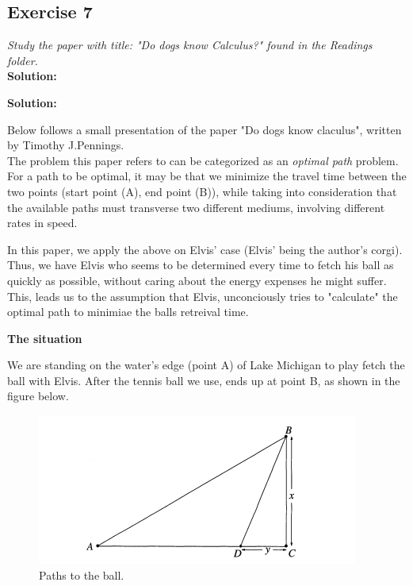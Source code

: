 \documentclass[12pt]{article}
\begin{document}

\subsection*{Exercise 7}
\textit{Study the paper with title: "Do dogs know Calculus?" found in the Readings folder.}\\
\textbf{Solution:} \par
\textbf{Solution:} \par
{Below follows a small presentation of the paper "Do dogs know claculus", written by Timothy J.Pennings.\\
The problem this paper refers to can be categorized as an \textit{optimal path} problem. For a path to be optimal, it may be that we minimize the travel time between the two points (start point (A), end point (B)), while taking into consideration that the available paths must transverse two different mediums, involving different rates in speed.\par 
In this paper, we apply the above on Elvis' case (Elvis' being the author's corgi). Thus, we have Elvis who seems to be determined every time to fetch his ball as quickly as possible, without caring about the energy expenses he might suffer. This, leads us to the assumption that Elvis, unconciously tries to "calculate" the optimal path to minimiae the balls retreival time.\par 
\begin{center}
\textbf{The situation}
\end{center}
We are standing on the water's edge (point A) of Lake Michigan to play fetch the ball with Elvis. After the tennis ball we use, ends up at point B, as shown in the figure below.
\begin{figure}[h!]
  \includegraphics[width=\linewidth]{pathsToTheBall.png}
  \caption{Paths to the ball.}
  \label{fig:path1}
\end{figure}
}
\end{document}
